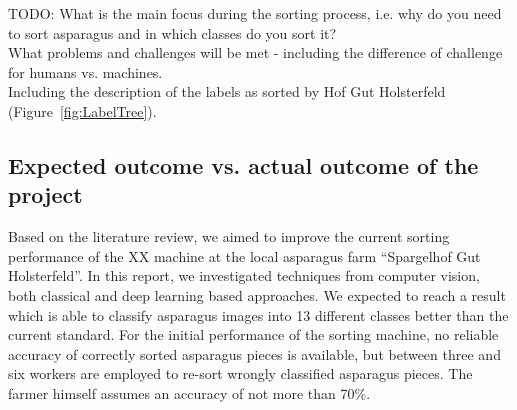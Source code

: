 TODO: What is the main focus during the sorting process, i.e. why do you need to sort asparagus and in which classes do you sort it? \\
What problems and challenges will be met - including the difference of challenge for humans vs. machines. \\
Including the description of the labels as sorted by Hof Gut Holsterfeld (Figure~\ref{fig:LabelTree}).


\subsection{Expected outcome vs. actual outcome of the project}

Based on the literature review, we aimed to improve the current sorting performance of the XX machine at the local asparagus farm “Spargelhof Gut Holsterfeld”. In this report, we investigated techniques from computer vision, both classical and deep learning based approaches. We expected to reach a result which is able to classify asparagus images into 13 different classes better than the current standard. For the initial performance of the sorting machine, no reliable accuracy of correctly sorted asparagus pieces is available, but between three and six workers are employed to re-sort wrongly classified asparagus pieces. The farmer himself assumes an accuracy of not more than 70\%. \\
 
